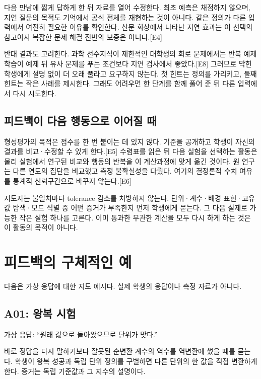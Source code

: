 \documentclass[
  10pt,
  a4paper,
]{article}
\begin{document}
다음 만남에 짧게 답하게 한 뒤 자료를 열어 수정한다. 최초 예측은 채점하지
않으며, 지연 질문의 목적도 기억에서 공식 전체를 재현하는 것이 아니다.
같은 정의가 다른 입력에서 여전히 필요한 이유를 확인한다. 산문 회상에서
나타난 지연 효과는 이 선택의 참고이지 복잡한 문제 해결 전반의 보증은
아니다.{[}E4{]}

반대 결과도 고려한다. 과학 선수지식이 제한적인 대학생의 회로 문제에서는
반복 예제 학습이 예제 뒤 유사 문제를 푸는 조건보다 지연 검사에서
좋았다.{[}E8{]} 그러므로 막힌 학생에게 설명 없이 더 오래 풀라고 요구하지
않는다. 첫 힌트는 정의를 가리키고, 둘째 힌트는 작은 사례를 제시한다.
그래도 어려우면 한 단계를 함께 풀어 준 뒤 다른 입력에서 다시 시도한다.

\subsection{피드백이 다음 행동으로 이어질
때}\label{uxd53cuxb4dcuxbc31uxc774-uxb2e4uxc74c-uxd589uxb3d9uxc73cuxb85c-uxc774uxc5b4uxc9c8-uxb54c}

형성평가의 목적은 점수를 한 번 붙이는 데 있지 않다. 기준을 공개하고
학생이 자신의 결과를 비교·수정할 수 있게 한다.{[}E5{]} 수렴표를 읽은 뒤
다음 실험을 선택하는 활동은 물리 실험에서 연구된 비교와 행동의 반복을 이
계산과정에 맞게 옮긴 것이다. 원 연구는 다른 연도의 집단을 비교했고 측정
불확실성을 다뤘다. 여기의 결정론적 수치 여유를 통계적 신뢰구간으로
바꾸지 않는다.{[}E6{]}

지도자는 불일치마다 tolerance 감소를 처방하지 않는다. 단위·계수·배경
표현·고유값 탐색·모드 식별 중 어떤 증거가 부족한지 먼저 학생에게 묻는다.
그 다음 실제로 가능한 작은 실험 하나를 고른다. 이미 통과한 무관한 계산을
모두 다시 하게 하는 것은 이 활동의 목적이 아니다.

\section{피드백의 구체적인
예}\label{uxd53cuxb4dcuxbc31uxc758-uxad6cuxccb4uxc801uxc778-uxc608}

다음은 가상 응답에 대한 지도 예시다. 실제 학생의 응답이나 측정 자료가
아니다.

\subsection{A01: 왕복 시험}\label{a01-uxc655uxbcf5-uxc2dcuxd5d8}

가상 응답: ``원래 값으로 돌아왔으므로 단위가 맞다.''

바로 정답을 다시 말하기보다 잘못된 순변환 계수의 역수를 역변환에 썼을
때를 묻는다. 학생이 왕복 성공과 독립 단위 정의를 구별하면 다른 단위의 한
값을 직접 변환하게 한다. 증거는 독립 기준값과 그 지수의 설명이다.
\end{document}
